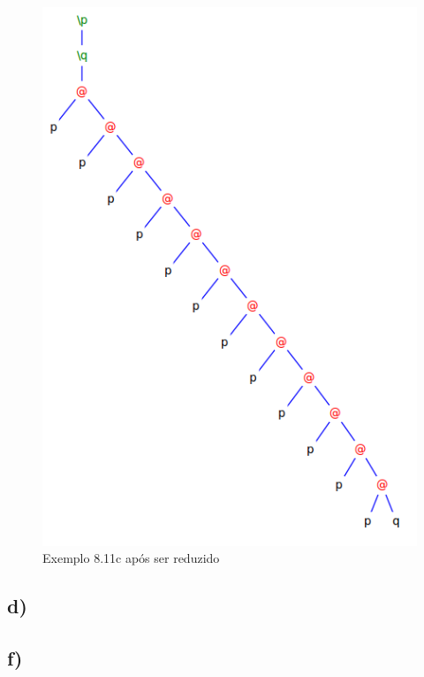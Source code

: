 \documentclass[a4paper]{article}
\begin{document}
\begin{figure}[h]
  \centering
  \includegraphics[scale=0.5]{8-11c_2.png}
  \caption{Exemplo 8.11c após ser reduzido}
\end{figure}

\FloatBarrier

\subsection*{d)}


\FloatBarrier

\subsection*{f)}
\end{document}
